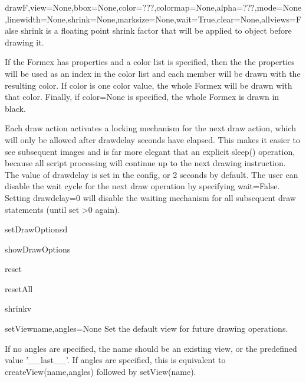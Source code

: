 \begin{funcdesc}{draw}{F,view=None,bbox=None,color=???,colormap=None,alpha=???,mode=None,linewidth=None,shrink=None,marksize=None,wait=True,clear=None,allviews=False}
    shrink is a floating point shrink factor that will be applied to object
    before drawing it.

    If the Formex has properties and a color list is specified, then the
    the properties will be used as an index in the color list and each member
    will be drawn with the resulting color.
    If color is one color value, the whole Formex will be drawn with
    that color.
    Finally, if color=None is specified, the whole Formex is drawn in black.
    
    Each draw action activates a locking mechanism for the next draw action,
    which will only be allowed after drawdelay seconds have elapsed. This
    makes it easier to see subsequent images and is far more elegant that an
    explicit sleep() operation, because all script processing will continue
    up to the next drawing instruction.
    The value of drawdelay is set in the config, or 2 seconds by default.
    The user can disable the wait cycle for the next draw operation by
    specifying wait=False. Setting drawdelay=0 will disable the waiting
    mechanism for all subsequent draw statements (until set >0 again).
    

\end{funcdesc}


\begin{funcdesc}{setDrawOptions}{d}


\end{funcdesc}


\begin{funcdesc}{showDrawOptions}{}


\end{funcdesc}


\begin{funcdesc}{reset}{}


\end{funcdesc}


\begin{funcdesc}{resetAll}{}


\end{funcdesc}


\begin{funcdesc}{shrink}{v}


\end{funcdesc}


\begin{funcdesc}{setView}{name,angles=None}
Set the default view for future drawing operations.

    If no angles are specified, the name should be an existing view, or
    the predefined value '__last__'.
    If angles are specified, this is equivalent to createView(name,angles)
    followed by setView(name).
    

\end{funcdesc}


